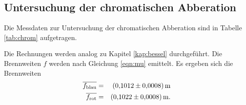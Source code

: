 \subsection{Untersuchung der chromatischen Abberation}
Die Messdaten zur Untersuchung der chromatischen Abberation sind in Tabelle \ref{tab:chrom} aufgetragen.

Die Rechnungen werden analog zu Kapitel \ref{kap:bessel} durchgeführt.
Die Brennweiten $f$ werden nach Gleichung \eqref{eqn:mu} emittelt.
Es ergeben sich die Brennweiten
\begin{align*}
  \overline{f_{\text{blau}}} &=& \SI{0.1012 \pm 0.0008}{m}\\
  \overline{f_{\text{rot}}}  &=& \SI{0.1022 \pm 0.0008}{m}.\\
\end{align*}

\FloatBarrier

